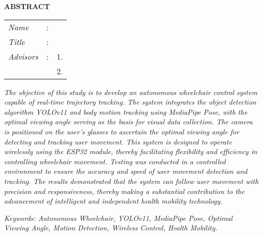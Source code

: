\begin{center}
  \large\textbf{ABSTRACT}
\end{center}


\vspace{2ex}

\begingroup
\setlength{\tabcolsep}{0pt}

\noindent
\begin{tabularx}{\textwidth}{l >{\centering}m{3em} X}
  \emph{Name}     & : & \name{}         \\

  \emph{Title}    & : & \engtatitle{}   \\

  \emph{Advisors} & : & 1. \advisor{}   \\
                  &   & 2. \coadvisor{} \\
\end{tabularx}
\endgroup

\emph{The objective of this study is to develop an autonomous wheelchair control system capable of real-time trajectory tracking. The system integrates the object detection algorithm YOLOv11 and body motion tracking using MediaPipe Pose, with the optimal viewing angle serving as the basis for visual data collection. The camera is positioned on the user's glasses to ascertain the optimal viewing angle for detecting and tracking user movement. This system is designed to operate wirelessly using the ESP32 module, thereby facilitating flexibility and efficiency in controlling wheelchair movement. Testing was conducted in a controlled environment to ensure the accuracy and speed of user movement detection and tracking. The results demonstrated that the system can follow user movement with precision and responsiveness, thereby making a substantial contribution to the advancement of intelligent and independent health mobility technology.}

\emph{Keywords: Autonomous Wheelchair, YOLOv11, MediaPipe Pose, Optimal Viewing Angle, Motion Detection, Wireless Control, Health Mobility.}
